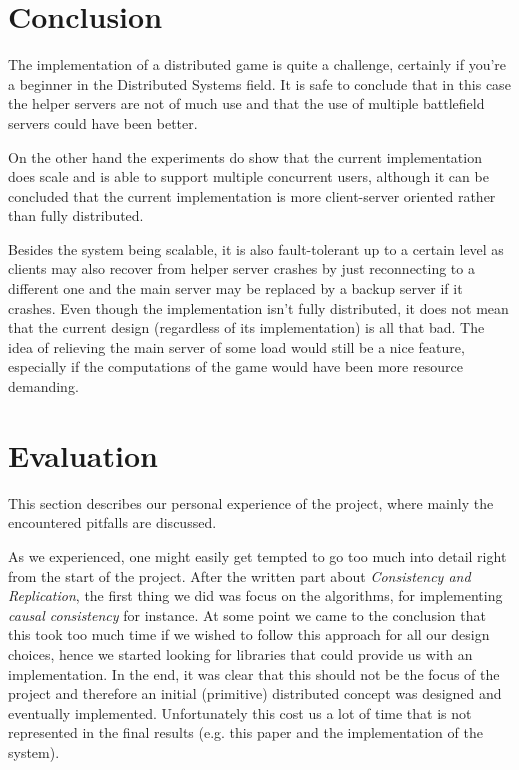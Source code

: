 \section{Conclusion}
The implementation of a distributed game is quite a challenge, certainly if you're a beginner in the Distributed Systems field. 
It is safe to conclude that in this case the helper servers are not of much use and that the use of multiple battlefield servers could have been better.

On the other hand the experiments do show that the current implementation does scale and is able to support multiple concurrent users, although it can be concluded that the current implementation is more client-server oriented rather than fully distributed.

Besides the system being scalable, it is also fault-tolerant up to a certain level as clients may also recover from helper server crashes by just reconnecting to a different one and the main server may be replaced by a backup server if it crashes.
Even though the implementation isn't fully distributed, it does not mean that the current design (regardless of its implementation) is all that bad. 
The idea of relieving the main server of some load would still be a nice feature, especially if the computations of the game would have been more resource demanding. 

 \section{Evaluation}
 This section describes our personal experience of the project, where mainly the encountered pitfalls are discussed.

As we experienced, one might easily get tempted to go too much into detail right from the start of the project.
After the written part about \emph{Consistency and Replication}, the first thing we did was focus on the algorithms, for implementing \emph{causal consistency} for instance. 
At some point we came to the conclusion that this took too much time if we wished to follow this approach for all our design choices, hence we started looking for libraries that could provide us with an implementation. 
In the end, it was clear that this should not be the focus of the project and therefore an initial (primitive) distributed concept was designed and eventually implemented. 
Unfortunately this cost us a lot of time that is not represented in the final results (e.g. this paper and the implementation of the system).

